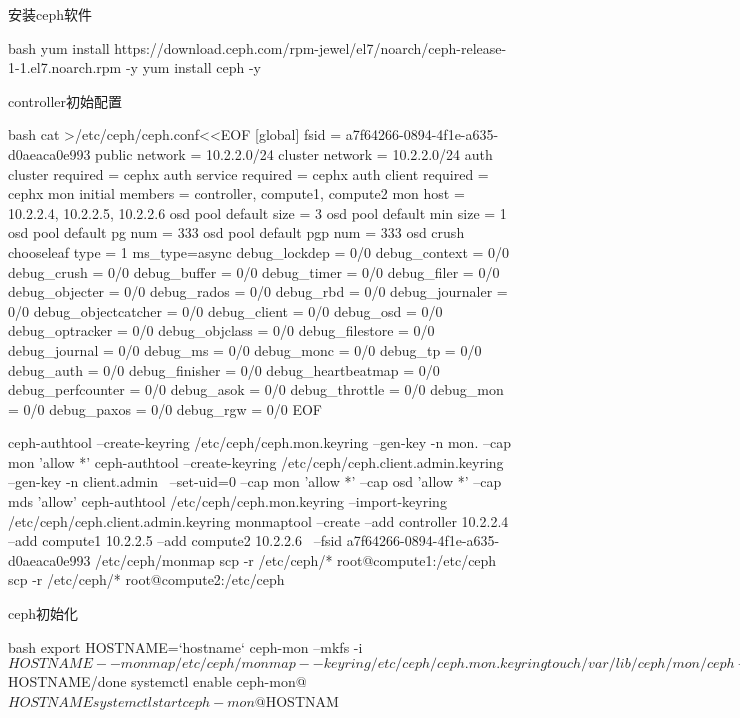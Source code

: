 \begin{outline}[enumerate]

\1 安装ceph软件
\begin{code-block}{bash}
yum install https://download.ceph.com/rpm-jewel/el7/noarch/ceph-release-1-1.el7.noarch.rpm -y
yum install ceph -y
\end{code-block}

\1 controller初始配置
\begin{code-block}{bash}
cat >/etc/ceph/ceph.conf<<EOF
[global]
fsid = a7f64266-0894-4f1e-a635-d0aeaca0e993
public network = 10.2.2.0/24
cluster network = 10.2.2.0/24
auth cluster required = cephx
auth service required = cephx
auth client required = cephx
mon initial members = controller, compute1, compute2
mon host = 10.2.2.4, 10.2.2.5, 10.2.2.6
osd pool default size = 3
osd pool default min size = 1
osd pool default pg num = 333
osd pool default pgp num = 333
osd crush chooseleaf type = 1
ms_type=async
debug_lockdep = 0/0
debug_context = 0/0
debug_crush = 0/0
debug_buffer = 0/0
debug_timer = 0/0
debug_filer = 0/0
debug_objecter = 0/0
debug_rados = 0/0
debug_rbd = 0/0
debug_journaler = 0/0
debug_objectcatcher = 0/0
debug_client = 0/0
debug_osd = 0/0
debug_optracker = 0/0
debug_objclass = 0/0
debug_filestore = 0/0
debug_journal = 0/0
debug_ms = 0/0
debug_monc = 0/0
debug_tp = 0/0
debug_auth = 0/0
debug_finisher = 0/0
debug_heartbeatmap = 0/0
debug_perfcounter = 0/0
debug_asok = 0/0
debug_throttle = 0/0
debug_mon = 0/0
debug_paxos = 0/0
debug_rgw = 0/0
EOF

ceph-authtool --create-keyring /etc/ceph/ceph.mon.keyring --gen-key -n mon. --cap mon 'allow *'
ceph-authtool --create-keyring /etc/ceph/ceph.client.admin.keyring --gen-key -n client.admin \
    --set-uid=0 --cap mon 'allow *' --cap osd 'allow *' --cap mds 'allow'
ceph-authtool /etc/ceph/ceph.mon.keyring --import-keyring /etc/ceph/ceph.client.admin.keyring
monmaptool --create --add controller 10.2.2.4 --add compute1 10.2.2.5 --add compute2 10.2.2.6 \
    --fsid a7f64266-0894-4f1e-a635-d0aeaca0e993 /etc/ceph/monmap
scp -r /etc/ceph/* root@compute1:/etc/ceph
scp -r /etc/ceph/* root@compute2:/etc/ceph
\end{code-block}

\1 ceph初始化
\begin{code-block}{bash}
export HOSTNAME=`hostname`
ceph-mon --mkfs -i $HOSTNAME --monmap /etc/ceph/monmap --keyring /etc/ceph/ceph.mon.keyring
touch /var/lib/ceph/mon/ceph-$HOSTNAME/done
systemctl enable ceph-mon@$HOSTNAME
systemctl start ceph-mon@$HOSTNAM


\end{code-block}
\end{outline}
